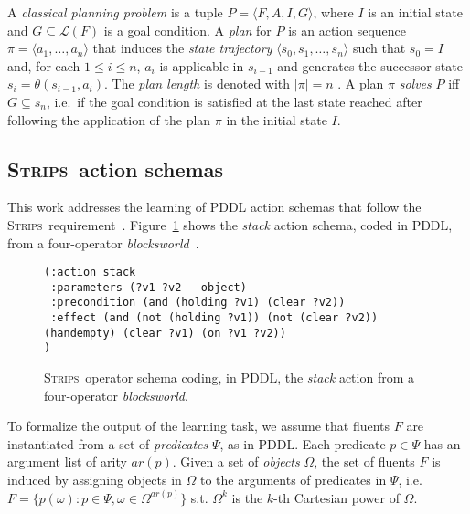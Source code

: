 \documentclass[3p,times]{elsarticle}
\newcommand{\strips}{\textsc{Strips}}     %
\newcommand{\tup}[1]{{\langle #1 \rangle}}
\begin{document}
A {\em classical planning problem} is a tuple $P=\tup{F,A,I,G}$, where $I$ is an initial state and $G\subseteq\mathcal{L}(F)$ is a goal condition. A {\em plan} for $P$ is an action sequence $\pi=\tup{a_1, \ldots, a_n}$ that induces the {\em state trajectory} $\tup{s_0, s_1, \ldots, s_n}$ such that $s_0=I$ and, for each {\small $1\leq i\leq n$}, $a_i$ is applicable in $s_{i-1}$ and generates the successor state $s_i=\theta(s_{i-1},a_i)$. The {\em plan length} is denoted with $|\pi|=n$ . A plan $\pi$ {\em solves} $P$ iff $G\subseteq s_n$, i.e.~if the goal condition is satisfied at the last state reached after following the application of the plan $\pi$ in the initial state $I$.


\subsection{\strips\ action schemas}
This work addresses the learning of PDDL action schemas that follow the \strips\ requirement~\cite{mcdermott1998pddl,fox2003pddl2}. Figure~\ref{fig:stack} shows the {\em stack} action schema, coded in PDDL, from a four-operator {\em blocksworld}~\cite{slaney2001blocks}.

\begin{figure}[hbt!]
\begin{footnotesize}
\begin{verbatim}
(:action stack
 :parameters (?v1 ?v2 - object)
 :precondition (and (holding ?v1) (clear ?v2))
 :effect (and (not (holding ?v1)) (not (clear ?v2)) (handempty) (clear ?v1) (on ?v1 ?v2))
)
\end{verbatim}
\end{footnotesize}
 \caption{\small \strips\ operator schema coding, in PDDL, the {\em stack} action from a four-operator {\em blocksworld}.}
\label{fig:stack}
\end{figure}

To formalize the output of the learning task, we assume that fluents $F$ are instantiated from a set of {\em predicates} $\Psi$, as in PDDL. Each predicate $p\in\Psi$ has an argument list of arity $ar(p)$. Given a set of {\em objects} $\Omega$, the set of fluents $F$ is induced by assigning objects in $\Omega$ to the arguments of predicates in $\Psi$, i.e.~$F=\{p(\omega):p\in\Psi,\omega\in\Omega^{ar(p)}\}$ s.t. $\Omega^k$ is the $k$-th Cartesian power of $\Omega$.
\end{document}
